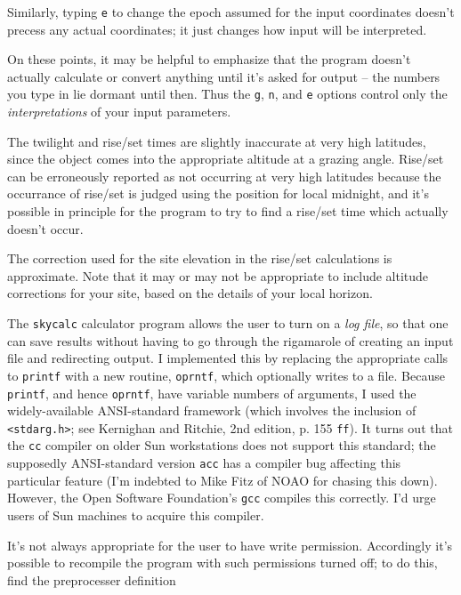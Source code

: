 Similarly, typing {\tt e} to change the epoch assumed for the input
coordinates doesn't precess any actual coordinates; it just changes
how input will be interpreted.

On these points, it may
be helpful to emphasize that the program doesn't actually calculate or
convert anything until it's asked for output -- the numbers you type
in lie dormant until then.  Thus the {\tt g}, {\tt n}, and {\tt e} options
control only the {\it interpretations} of your input parameters.

The twilight and rise/set times are slightly inaccurate at
very high latitudes, since the object comes into the appropriate
altitude at a grazing angle.  Rise/set can be erroneously
reported as not occurring at very high latitudes because the
occurrance of rise/set is judged using the position for local
midnight, and it's possible in principle for the program to 
try to find a rise/set time which actually doesn't occur.

The correction used for the site elevation in the rise/set
calculations is approximate.  Note that 
it may or may not be appropriate to include altitude corrections
for your site, based on the details of your local horizon.


The {\tt skycalc} calculator program 
allows the user to turn on a {\it log file}, so that one can
save results without having to go through the rigamarole of
creating an input file and redirecting output.  I implemented this
by replacing the appropriate calls to {\tt printf} with a new routine,
{\tt oprntf}, which optionally writes to a file.  Because
{\tt printf}, and hence {\tt oprntf}, have variable numbers of arguments, 
I used the widely-available ANSI-standard framework (which involves
the inclusion of {\tt <stdarg.h>}; see 
Kernighan and Ritchie, 2nd edition, p. 155 {\tt ff}).  It turns out that
the {\tt cc} compiler on older Sun workstations does not support this
standard; the supposedly ANSI-standard version {\tt acc} has
a compiler bug affecting this particular feature (I'm indebted to
Mike Fitz of NOAO for chasing this down).  However, the Open
Software Foundation's {\tt gcc} compiles this correctly.  I'd
urge users of Sun machines to acquire this compiler.

It's not always appropriate for the user to have write permission.
Accordingly it's possible to recompile the program with such
permissions turned off; to do this, find the preprocesser definition 


